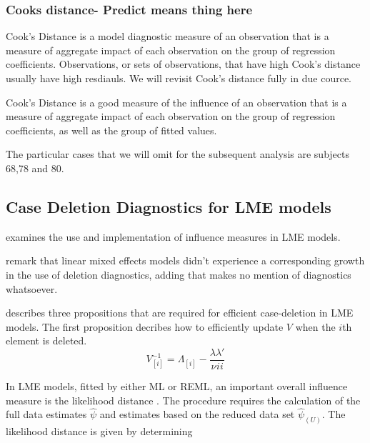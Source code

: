 \documentclass[12pt, a4paper]{report}
\theoremstyle{plain}
\theoremstyle{definition}
\theoremstyle{remark}
\begin{document}
	\subsubsection{Cooks distance- Predict means thing here}
	Cook's Distance is a model diagnostic measure of an observation that is a measure of aggregate impact of each observation on the group of regression coefficients. Observations, or sets of observations, that have high Cook's distance usually have high resdiauls. We will revisit Cook's distance fully in due cource.
	
	Cook's Distance is a good measure of the influence of an observation that is a measure of aggregate impact of each observation on the group of regression coefficients, as well as the group of fitted values.
	
	
	
	
	
	The particular cases that we will omit for the subsequent analysis are subjects 68,78 and 80.
	
	\subsection{Case Deletion Diagnostics for LME models}
	\citet{schabenberger} examines the use and implementation of
	influence measures in LME models.
	
	\citet{HaslettDillane} remark that linear mixed effects models
	didn't experience a corresponding growth in the use of deletion
	diagnostics, adding that \citet{McCullSearle} makes no mention of
	diagnostics whatsoever.

	
	\citet{Christensen} describes three propositions that are required
	for efficient case-deletion in LME models. The first proposition
	decribes how to efficiently update $V$ when the $i$th element is
	deleted.
	\begin{equation}
	V_{[i]}^{-1} = \Lambda_{[i]} - \frac{\lambda
		\lambda\prime}{\nu^{}ii}
	\end{equation}
	
	

	In LME models, fitted by either ML or REML, an important overall
	influence measure is the likelihood distance \citep{cook86}. The
	procedure requires the calculation of the full data estimates
	$\hat{\psi}$ and estimates based on the reduced data set
	$\hat{\psi}_{(U)}$. The likelihood distance is given by
	determining
	
\end{document}
